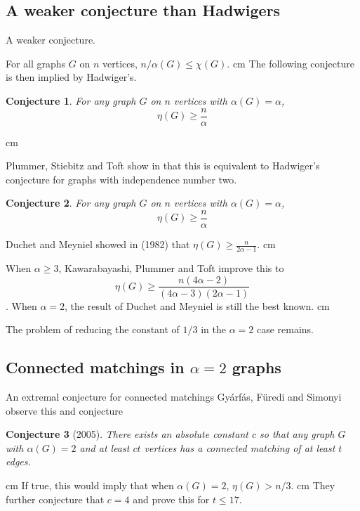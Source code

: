 \documentclass{beamer}
\newtheorem{conjecture}{Conjecture}
\newcommand{\bframe}[2]{\begin{frame}{#1}#2\end{frame}}
\begin{document}
\subsection{A weaker conjecture than Hadwigers}

\bframe{A weaker conjecture.}{

	For all graphs $G$ on $n$ vertices, $n/\alpha(G) \leq \chi(G)$.\pause\vskip 0.5 cm
 The following conjecture is then implied by Hadwiger's.\pause
\begin{conjecture}\label{hc}
 For any graph $G$ on $n$ vertices with $\alpha(G) =\alpha$, \[\eta(G) \geq \frac{n}{\alpha}\]
\end{conjecture}
\pause \vskip 0.25 cm

Plummer, Stiebitz and Toft  show in \cite{MR2070161} that this is equivalent to Hadwiger's conjecture for graphs with independence number two.

}

\bframe{}{
\begin{conjecture}\label{hc}
 For any graph $G$ on $n$ vertices with $\alpha(G) =\alpha$, \[\eta(G) \geq \frac{n}{\alpha}\]
\end{conjecture}\pause
 Duchet and Meyniel showed in  \cite{MR671905} (1982) that $\displaystyle\eta(G) \geq \frac{ n}{2\alpha - 1}$.\pause \vskip 0.5 cm 

When $\alpha \geq 3$, Kawarabayashi, Plummer and Toft \cite{MR2156345} improve this to 
\[\eta(G) \geq \frac{n(4\alpha-2)}{(4\alpha-3)(2\alpha -1)}\].   \pause  When $\alpha = 2$, the result of Duchet and Meyniel is still the best known. \pause \vskip 0.5 cm

The problem of reducing the constant of $1/3$ in the $\alpha  = 2 $ case remains. 
}

\subsection{Connected matchings in $\alpha = 2$ graphs}

\bframe{An extremal conjecture for connected matchings}{
  Gy\'arf\'as, F\"uredi and Simonyi observe this and conjecture \pause 
 	\begin{conjecture}[2005]
  		There exists an absolute constant $c$ so that any graph $G$ with $\alpha(G) =2$ and at least $ct$ vertices has a connected matching of at least $t$ edges.
 	\end{conjecture}\vskip 0.5 cm\pause
 	If true, this would imply that when $\alpha(G) = 2$, $\eta(G) > n/3$. \pause\vskip 0.5 cm 
 They further conjecture that $c = 4$ and prove this for $t \leq 17$.}
\end{document}
